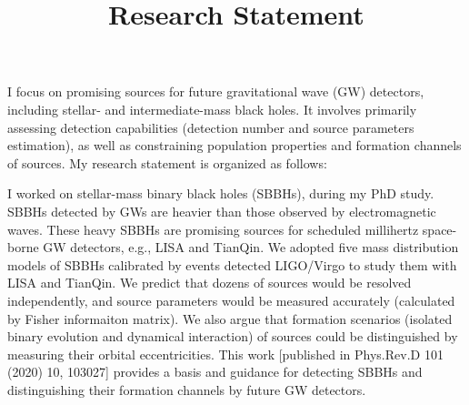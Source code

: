 \documentclass[12pt,a4paper,sans]{article}%
\title{\vspace{-2.5cm}\Huge Research Statement \vspace{-2.2em}}
\date{}
\begin{document}
\maketitle

I focus on promising sources for future gravitational wave (GW) detectors, including stellar- and
intermediate-mass black holes. It involves primarily assessing detection capabilities (detection number and source
parameters estimation), as well as constraining population properties and formation channels of sources. My research statement is organized as
follows:  

I worked on stellar-mass binary black holes (SBBHs), during my PhD study. SBBHs detected by GWs are heavier than those observed by electromagnetic waves. These heavy SBBHs are promising sources for scheduled
millihertz space-borne GW detectors, e.g., LISA and TianQin. We adopted five mass
distribution models of SBBHs calibrated by events detected LIGO/Virgo to study them with LISA and TianQin. We predict
that dozens of sources would be resolved independently, and source parameters
would be measured accurately (calculated by Fisher informaiton matrix). We also argue that formation scenarios (isolated binary evolution and dynamical interaction) of sources
could be distinguished by measuring their orbital eccentricities. This work [published in Phys.Rev.D 101 (2020) 10, 103027] provides a basis and guidance for detecting SBBHs and distinguishing their formation channels by future GW detectors. 
\end{document}
